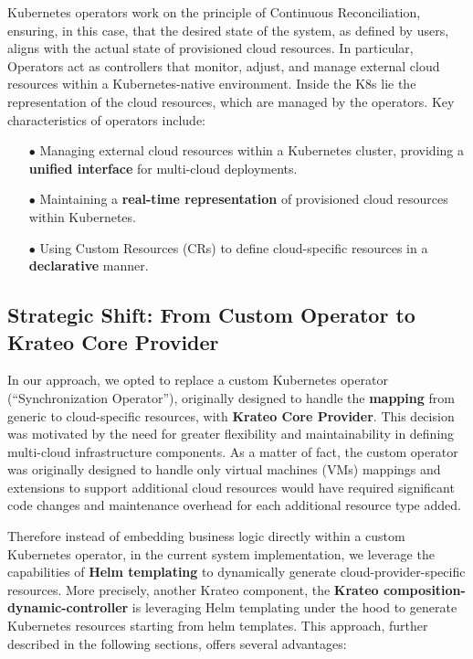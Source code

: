 Kubernetes operators work on the principle of Continuous Reconciliation, ensuring, in this case, that the desired state of the system, as defined by users, aligns with the actual state of provisioned cloud resources. In particular, Operators act as controllers that monitor, adjust, and manage external cloud resources within a Kubernetes-native environment. Inside the K8s lie the representation of the cloud resources, which are managed by the operators.
Key characteristics of operators include:
\begin{itemize}[itemsep=0.2pt, topsep=1pt]
  \item[$\bullet$] Managing external cloud resources within a Kubernetes cluster, providing a \textbf{unified interface} for multi-cloud deployments.
  \item[$\bullet$] Maintaining a \textbf{real-time representation} of provisioned cloud resources within Kubernetes.
  \item[$\bullet$] Using Custom Resources (CRs) to define cloud-specific resources in a \textbf{declarative} manner.
\end{itemize}

\subsection{Strategic Shift: From Custom Operator to Krateo Core Provider}

In our approach, we opted to replace a custom Kubernetes operator (``Synchronization Operator''), originally designed to handle the \textbf{mapping} from generic to cloud-specific resources, with \textbf{Krateo Core Provider}. This decision was motivated by the need for greater flexibility and maintainability in defining multi-cloud infrastructure components. As a matter of fact, the custom operator was originally designed to handle only virtual machines (VMs) mappings and extensions to support additional cloud resources would have required significant code changes and maintenance overhead for each additional resource type added.

Therefore instead of embedding business logic directly within a custom Kubernetes operator, in the current system implementation, we leverage the capabilities of \textbf{Helm templating} to dynamically generate cloud-provider-specific resources. More precisely, another Krateo component, the \textbf{Krateo composition-dynamic-controller} is leveraging Helm templating under the hood to generate Kubernetes resources starting from helm templates.
This approach, further described in the following sections, offers several advantages:

